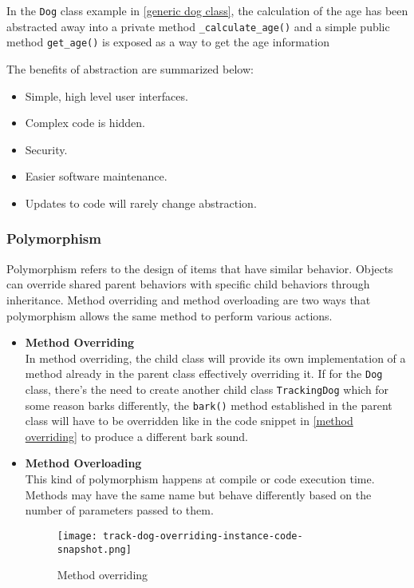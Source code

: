 In the \verb+Dog+ class example in \autoref{generic dog class}, the calculation of the age has been abstracted away into a private method \verb+_calculate_age()+ and a simple public method \verb+get_age()+ is exposed as a way to get the age information

The benefits of abstraction are summarized below:
\begin{itemize}
  \item Simple, high level user interfaces.
  \item Complex code is hidden.
  \item Security.
  \item Easier software maintenance.
  \item Updates to code will rarely change abstraction.
\end{itemize}

\subsubsection{Polymorphism}
Polymorphism refers to the design of items that have similar behavior. Objects can override shared parent behaviors with specific child behaviors through inheritance. Method overriding and method overloading are two ways that polymorphism allows the same method to perform various actions.

\begin{itemize}
  \item \textbf{Method Overriding} \\ In method overriding, the child class will provide its own implementation of a method already in the parent class effectively overriding it. If for the \verb+Dog+ class, there’s the need to create another child class \verb+TrackingDog+ which for some reason barks differently, the \verb+bark()+ method established in the parent class will have to be overridden like in the code snippet in \autoref{method overriding} to produce a different bark sound.

  \item \textbf{Method Overloading} \\ This kind of polymorphism happens at compile or code execution time. Methods may have the same name but behave differently based on the number of parameters passed to them.

  \begin{figure}[H]
    \centering
    \texttt{[image: track-dog-overriding-instance-code-snapshot.png]}
    \caption{Method overriding}
    \label{method overriding}
  \end{figure}
\end{itemize}

